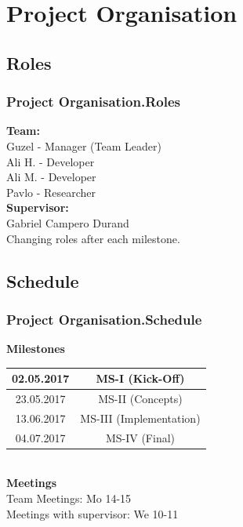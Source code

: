 \documentclass{beamer}
\begin{document}
\section{Project Organisation}


\subsection{Roles}
\begin{frame}
\frametitle{Project Organisation.Roles}

\textbf{Team:} \\
\hspace{0.3 cm}Guzel - Manager (Team Leader)\\
\hspace{0.3 cm}Ali H. - Developer\\
\hspace{0.3 cm}Ali M. - Developer\\
\hspace{0.3 cm}Pavlo - Researcher\\

\vspace{0.2 cm}
\textbf{Supervisor:} \\
\hspace{0.3 cm} Gabriel Campero Durand \\

\vspace{0.2 cm}
Changing roles after each milestone.

\end{frame}


\subsection{Schedule}
\begin{frame}
\frametitle{Project Organisation.Schedule}
\textbf{Milestones} \\
\vspace{0.5 cm}
\begin{tabular}{|c|c|}
\hline 
02.05.2017 & MS-I (Kick-Off) \\ 
\hline 
23.05.2017 & MS-II (Concepts) \\ 
\hline 
13.06.2017 & MS-III (Implementation) \\ 
\hline 
04.07.2017 & MS-IV (Final) \\ 
\hline 
\end{tabular}
\\ \vspace{0.5 cm}
\textbf{Meetings} \\ 
\vspace{0.5 cm}
\hspace{0.5 cm} Team Meetings: Mo 14-15 \\
\hspace{0.5 cm} Meetings with supervisor: We 10-11

\end{frame}
\end{document}
